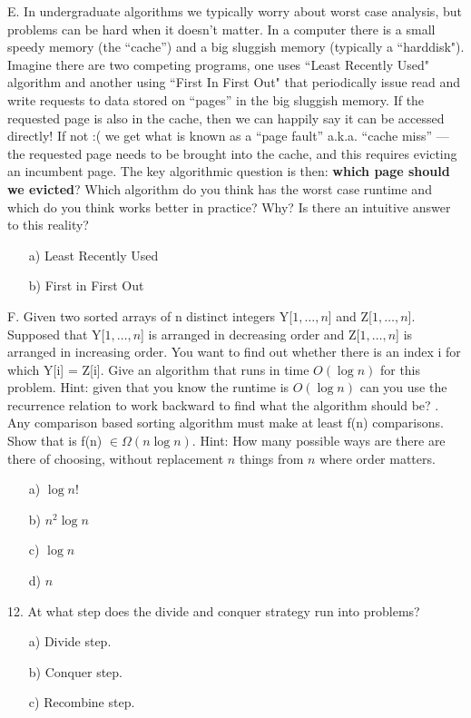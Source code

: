 \documentclass[12pt]{article}
\begin{document}
E. In undergraduate algorithms we typically worry about worst case analysis, but problems can be hard when it doesn't matter. In a computer there is a small speedy memory (the ``cache”) and a big sluggish memory (typically a ``harddisk"). Imagine there are two competing programs, one uses ``Least Recently Used" algorithm and another using ``First In First Out" that periodically issue read and write requests to data stored on ``pages” in the big sluggish memory. If the requested page is also in the cache, then we can happily say it can be accessed directly! If not :( we get what is known as a ``page fault” a.k.a. ``cache miss” — the requested page needs to be brought into the cache, and this requires evicting an incumbent page. The key algorithmic question is then: \textbf{which page should we evicted}? Which algorithm do you think has the worst case runtime and which do you think works better in practice? Why? Is there an intuitive answer to this reality?\\
\begin{enumerate}
    \item[a)]Least Recently Used
    \item[b)]First in First Out
\end{enumerate}
\newpage
\noindent F. Given two sorted arrays of n distinct integers Y[$1,\dots,n$] and Z[$1,\dots,n$]. Supposed that Y[$1,\dots,n$] is arranged in decreasing order and Z[$1,\dots,n$] is arranged in increasing order.
You want to find out whether there is an index i for which Y[i] = Z[i]. Give an algorithm that runs in time $O(\log{n})$ for this problem. Hint: given that you know the runtime is $O(\log{n})$ can you use the recurrence relation to work backward to find what the algorithm should be?
\newpage
{}. Any comparison based sorting algorithm must make at least f(n) comparisons. Show that is f(n) $\in \Omega(n\log{n})$. Hint: How many possible ways are there are there of choosing, without replacement $n$ things from $n$ where order matters.
\begin{enumerate}
    \item[a)]$\log{n!}$
    \item[b)]$n^2\log{n}$
    \item[c)]$\log{n}$
    \item[d)]$n$
\end{enumerate}
12. At what step does the divide and conquer strategy run into problems?
\begin{enumerate}
    \item[a)]Divide step.
    \item[b)]Conquer step.
    \item[c)]Recombine step.
\end{enumerate}
\end{document}
